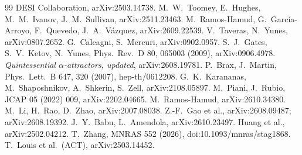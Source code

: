 \documentclass[11pt]{article}
\begin{document}
\begin{thebibliography}{99}
 DESI Collaboration, arXiv:2503.14738.
 M.~W.~Toomey, E.~Hughes, M.~M.~Ivanov, J.~M.~Sullivan, arXiv:2511.23463.
 M.~Ramos-Hamud, G.~Garc\'ia-Arroyo, F.~Quevedo, J.~A.~V\'azquez, arXiv:2609.22539.
 V.~Taveras, N.~Yunes, arXiv:0807.2652.
 G.~Calcagni, S.~Mercuri, arXiv:0902.0957.
 S.~J.~Gates, S.~V.~Ketov, N.~Yunes, Phys.\ Rev.\ D 80, 065003 (2009), arXiv:0906.4978.
 \emph{Quintessential $\alpha$-attractors, updated}, arXiv:2608.19781.
 P.~Brax, J.~Martin, Phys.\ Lett.\ B 647, 320 (2007), hep-th/0612208.
 G.~K.~Karananas, M.~Shaposhnikov, A.~Shkerin, S.~Zell, arXiv:2108.05897.
 M.~Piani, J.~Rubio, JCAP 05 (2022) 009, arXiv:2202.04665.
 M.~Ramos-Hamud, arXiv:2610.34380.
 M.~Li, H.~Rao, D.~Zhao, arXiv:2007.08038.
 Z.-F.~Gao et al., arXiv:2608.09487; arXiv:2608.19392.
 J.~Y.~Babu, L.~Amendola, arXiv:2610.23497.
 Huang et al., arXiv:2502.04212.
 T.~Zhang, MNRAS 552 (2026), doi:10.1093/mnras/stag1868.
 T.~Louis et al.\ (ACT), arXiv:2503.14452.
\end{thebibliography}
\end{document}
